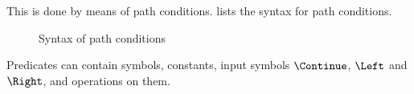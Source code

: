 This is done by means of path conditions.
 lists the syntax for path conditions.

\begin{figure}
  \small
  \caption{Syntax of path conditions}
  \label{fig:syntaxpredicates}
\end{figure}

Predicates can contain symbols, constants, input symbols $\Continue$, $\Left$ and $\Right$, and operations on them.
